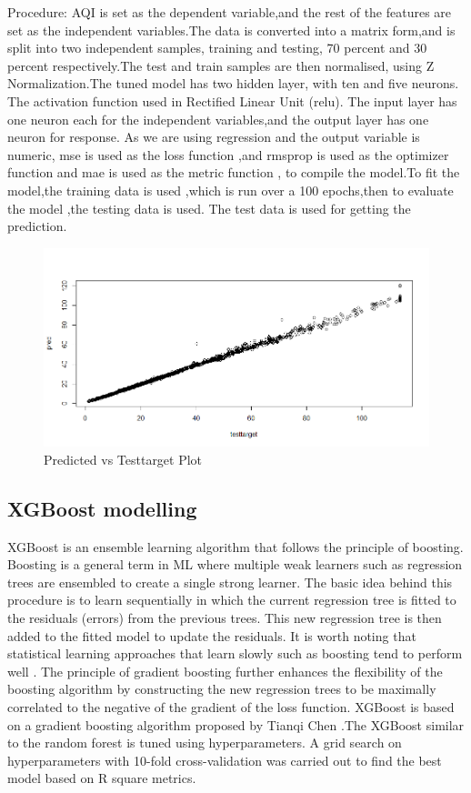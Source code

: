 \par
Procedure:
AQI is set as the dependent variable,and the rest of the  features are set as the independent variables.The data is converted into a matrix form,and is split into two independent samples, training and testing, 70 percent and 30 percent respectively.The test and train samples are then normalised, using Z Normalization.The tuned model has two hidden layer, with ten and five neurons. The activation function used in Rectified Linear Unit (relu). The input layer has one neuron each for the independent variables,and the output layer has one neuron for response. As we are using regression and the output variable is numeric, mse  is used as the loss function ,and rmsprop is used as the optimizer function and mae is used as the metric function , to compile the model.To fit the model,the training data is used ,which is run over a 100 epochs,then to evaluate the model ,the testing data is used. The test data is used for getting the prediction.
\begin{figure}[h]
\label{ss}
\centering
\includegraphics[width= 14 cm]{deep_target_vs_prediction_plot.png}
\caption{Predicted vs Testtarget Plot}
\end{figure}\pagebreak

\subsection{XGBoost modelling}
XGBoost is an ensemble learning algorithm that follows the principle of boosting. Boosting is a general term in ML where multiple weak learners such as regression trees are ensembled to create a single strong learner. The basic idea behind this procedure is to learn sequentially in which the current regression tree is fitted to the residuals (errors) from the previous trees. This new regression tree is then added to the fitted model to update the residuals. It is worth noting that statistical learning approaches that learn slowly such as boosting tend to perform well . The principle of gradient boosting further enhances the flexibility of the boosting algorithm by constructing the new regression trees to be maximally correlated to the negative of the gradient of the loss function. 
XGBoost is based on a gradient boosting algorithm proposed by Tianqi Chen .The XGBoost similar to the random forest is tuned using hyperparameters. A grid search on hyperparameters with 10-fold cross-validation was carried out to find the best model based on R square metrics.\linebreak

